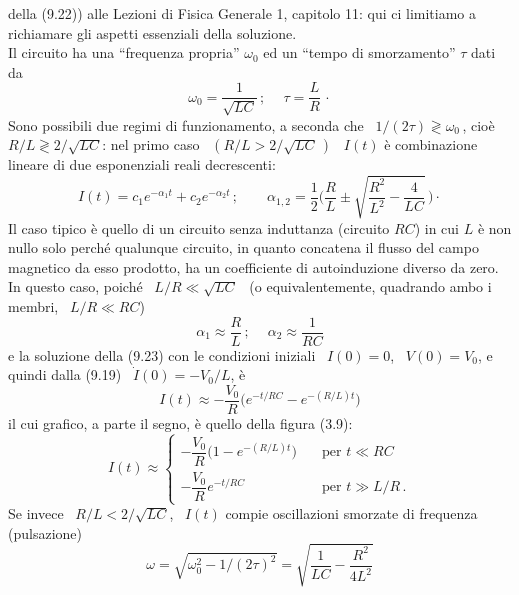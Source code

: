 della (9.22)\big) alle Lezioni di Fisica Generale 1, capitolo 11: qui ci
limitiamo a richiamare gli aspetti essenziali della soluzione.\\
Il circuito ha una ``frequenza propria'' $\omega_0$ ed un ``tempo di
smorzamento'' $\tau$ dati da
\begin{equation}
  \omega_0=\frac{1}{\sqrt{LC}}\,;\quad\ \tau=\frac{L}{R}\,\cdot
  \tag{9.24}
\end{equation}
Sono possibili due regimi di funzionamento, a seconda che
\ $1/(2\tau)\gtrless\omega_0$\,, cio\`e \ $R/L\gtrless2/\sqrt{LC}$: nel primo
caso \ $(R/L>2/\sqrt{LC}\,)$ \ $I(t)$ \`e combinazione lineare di due
esponenziali reali decrescenti:
\begin{equation}
  I(t)=c_1e^{-\alpha_1t}+c_2e^{-\alpha_2t}\,;
  \qquad\alpha_{1,2}=\frac{1}{2}\Big(\frac{R}{L}
  \pm\sqrt{\frac{R^2}{L^2}-\frac{4}{LC}}\,\Big)\cdot
  \tag{9.25}
\end{equation}
Il caso tipico \`e quello di un circuito senza induttanza (circuito $RC$) in cui
$L$ \`e non nullo solo perch\'e qualunque circuito, in quanto concatena il
flusso del campo magnetico da esso prodotto, ha un coefficiente di autoinduzione
diverso da zero. In questo caso, poich\'e \ $L/R\ll\sqrt{LC}$ \ (o
equivalentemente, quadrando ambo i membri, \ $L/R\ll RC$)
\begin{equation}
  \alpha_1\approx\frac{R}{L}\,;\quad\ \alpha_2\approx\frac{1}{RC}
  \tag{9.26}
\end{equation}
e la soluzione della (9.23) con le condizioni iniziali \ $I(0)=0$, \ $V(0)=V_0$,
e quindi dalla (9.19) \ $\dot I(0)=-V_0/L$, \`e
\begin{equation}
  I(t)\approx-\frac{V_0}{R}\big(e^{-t/RC}-e^{-(R/L)t}\big)
  \tag{9.27}
\end{equation}
il cui grafico, a parte il segno, \`e quello della figura (3.9):
\begin{equation}
  I(t)\approx\left\{\begin{array}{ll}
    -\dfrac{V_0}{R}\big(1-e^{-(R/L)t}\big)&\quad\text{per }t\ll RC\\[10pt]
    -\dfrac{V_0}{R}e^{-t/RC}&\quad\text{per }t\gg L/R\,.
  \end{array}\right.
  \tag{9.28}
\end{equation}
Se invece \ $R/L<2/\sqrt{LC}$, \ $I(t)$ compie oscillazioni smorzate di
frequenza (pulsazione)
\begin{equation}
  \omega=\sqrt{\omega_0^2-1/(2\tau)^2}=\sqrt{\frac{1}{LC}-\frac{R^2}{4L^2}}
  \tag{9.29}
\end{equation}
